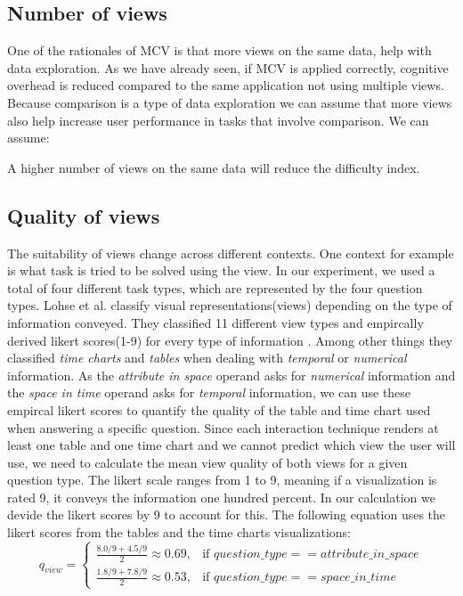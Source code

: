 \subsection{Number of views}
One of the rationales of MCV is that more views on the same data, help with data exploration. As we have already seen, if MCV
is applied correctly, cognitive overhead is reduced compared to the same application not using multiple views.
Because comparison is a type of data exploration we can assume that more views also help increase user performance in tasks
that involve comparison. We can assume:
\begin{statements}
    \item A higher number of views on the same data will reduce the difficulty index.
\end{statements}
\subsection{Quality of views}
The suitability of views change across different contexts. One context for example is what task is tried to be solved
using the view. In our experiment, we used a total of four different task types, which are represented by the four question
types. Lohse et al. classify visual representations(views)
depending on the type of information conveyed. They classified 11 different view types and empircally derived likert
scores(1-9) for every type of information \citep*{Lohse.1994}. Among other things they classified \textit{time charts} and 
\textit{tables} when dealing with \textit{temporal} or \textit{numerical} information. As the \textit{attribute in space} operand
asks for \textit{numerical} information and the \textit{space in time} operand asks for \textit{temporal} information, we can 
use these empircal likert scores to quantify the quality of the table and time chart used when answering a specific question.
Since each interaction technique renders at least one table and one time chart and we cannot predict which view the user will use, we
need to calculate the mean view quality of both views for a given question type. The likert scale ranges from 1 to 9, meaning if a
visualization is rated 9, it conveys the information one hundred percent. In our calculation we devide the likert scores by 9 to account
for this. The following equation uses the likert scores from the tables and the time charts visualizations:
\begin{equation} \label{qualityViewEquation}
    q_{view}= 
    \begin{cases}
        \frac{8.0 / 9 + 4.5 / 9}{2} \approx 0.69,& \text{if } question\_type == attribute\_in\_space \\
        \frac{1.8 / 9 + 7.8 / 9}{2} \approx 0.53,& \text{if } question\_type == space\_in\_time 
    \end{cases}
\end{equation}
